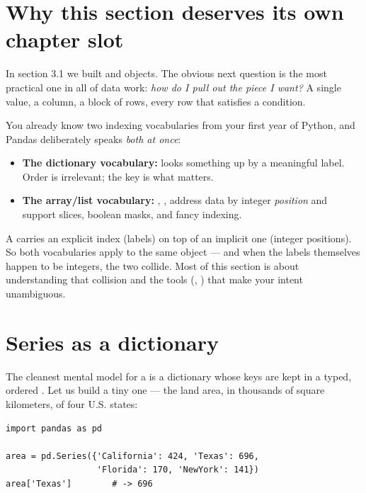 \documentclass[11pt]{article}
\begin{document}

\section{Why this section deserves its own chapter slot}

In section 3.1 we built  and  objects. The obvious next question is the most practical one in all of data work: \emph{how do I pull out the piece I want?} A single value, a column, a block of rows, every row that satisfies a condition.

\begin{background}
You already know two indexing vocabularies from your first year of Python, and Pandas deliberately speaks \emph{both at once}:
\begin{itemize}
  \item \textbf{The dictionary vocabulary:}  looks something up by a meaningful label. Order is irrelevant; the key is what matters.
  \item \textbf{The array/list vocabulary:} , ,  address data by integer \emph{position} and support slices, boolean masks, and fancy indexing.
\end{itemize}
A  carries an explicit index (labels) on top of an implicit one (integer positions). So both vocabularies apply to the same object --- and when the labels themselves happen to be integers, the two collide. Most of this section is about understanding that collision and the tools (, ) that make your intent unambiguous.
\end{background}

\section{Series as a dictionary}

The cleanest mental model for a  is a dictionary whose keys are kept in a typed, ordered . Let us build a tiny one --- the land area, in thousands of square kilometers, of four U.S. states:

\begin{lstlisting}
import pandas as pd

area = pd.Series({'California': 424, 'Texas': 696,
                  'Florida': 170, 'NewYork': 141})
area['Texas']        # -> 696
\end{lstlisting}
\end{document}
